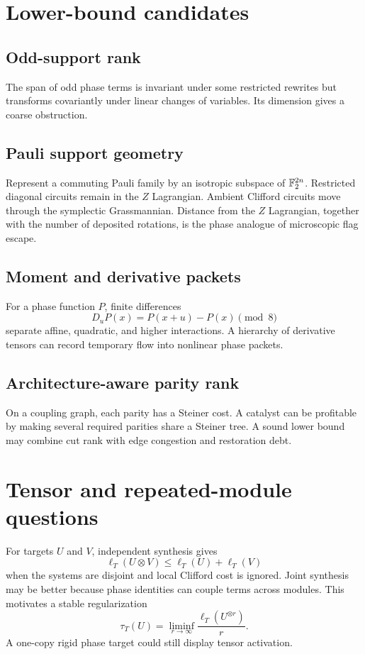 \section{Lower-bound candidates}
\subsection{Odd-support rank}
The span of odd phase terms is invariant under some restricted rewrites but transforms covariantly under linear changes of variables.  Its dimension gives a coarse obstruction.

\subsection{Pauli support geometry}
Represent a commuting Pauli family by an isotropic subspace of $\mathbb F_2^{2n}$.  Restricted diagonal circuits remain in the $Z$ Lagrangian.  Ambient Clifford circuits move through the symplectic Grassmannian.  Distance from the $Z$ Lagrangian, together with the number of deposited rotations, is the phase analogue of microscopic flag escape.

\subsection{Moment and derivative packets}
For a phase function $P$, finite differences
\[
D_uP(x)=P(x+u)-P(x)\pmod8
\]
separate affine, quadratic, and higher interactions.  A hierarchy of derivative tensors can record temporary flow into nonlinear phase packets.

\subsection{Architecture-aware parity rank}
On a coupling graph, each parity has a Steiner cost.  A catalyst can be profitable by making several required parities share a Steiner tree.  A sound lower bound may combine cut rank with edge congestion and restoration debt.

\section{Tensor and repeated-module questions}
For targets $U$ and $V$, independent synthesis gives
\[
\ell_T(U\otimes V)
\le
\ell_T(U)+\ell_T(V)
\]
when the systems are disjoint and local Clifford cost is ignored.  Joint synthesis may be better because phase identities can couple terms across modules.  This motivates a stable regularization
\[
\tau_T(U)=
\liminf_{r\to\infty}
\frac{\ell_T(U^{\otimes r})}{r}.
\]
A one-copy rigid phase target could still display tensor activation.

